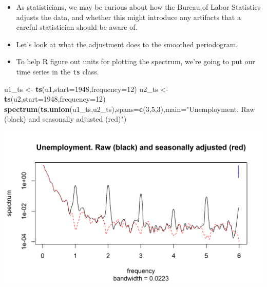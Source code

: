 \documentclass[]{article}
\newenvironment{Shaded}{\begin{snugshade}}{\end{snugshade}}
\newcommand{\KeywordTok}[1]{\textcolor[rgb]{0.13,0.29,0.53}{\textbf{#1}}}
\newcommand{\DataTypeTok}[1]{\textcolor[rgb]{0.13,0.29,0.53}{#1}}
\newcommand{\DecValTok}[1]{\textcolor[rgb]{0.00,0.00,0.81}{#1}}
\newcommand{\StringTok}[1]{\textcolor[rgb]{0.31,0.60,0.02}{#1}}
\newcommand{\NormalTok}[1]{#1}
\begin{document}
\begin{itemize}
\item
  As statisticians, we may be curious about how the Bureau of Labor
  Statistics adjusts the data, and whether this might introduce any
  artifacts that a careful statistician should be aware of.
\item
  Let's look at what the adjustment does to the smoothed periodogram.
\item
  To help R figure out units for plotting the spectrum, we're going to
  put our time series in the \texttt{ts} class.
\end{itemize}

\begin{Shaded}
\begin{Highlighting}[]
\NormalTok{u1_ts <-}\StringTok{ }\KeywordTok{ts}\NormalTok{(u1,}\DataTypeTok{start=}\DecValTok{1948}\NormalTok{,}\DataTypeTok{frequency=}\DecValTok{12}\NormalTok{)}
\NormalTok{u2_ts <-}\StringTok{ }\KeywordTok{ts}\NormalTok{(u2,}\DataTypeTok{start=}\DecValTok{1948}\NormalTok{,}\DataTypeTok{frequency=}\DecValTok{12}\NormalTok{)}
\KeywordTok{spectrum}\NormalTok{(}\KeywordTok{ts.union}\NormalTok{(u1_ts,u2_ts),}\DataTypeTok{spans=}\KeywordTok{c}\NormalTok{(}\DecValTok{3}\NormalTok{,}\DecValTok{5}\NormalTok{,}\DecValTok{3}\NormalTok{),}\DataTypeTok{main=}\StringTok{"Unemployment. Raw (black) and seasonally adjusted (red)"}\NormalTok{)}
\end{Highlighting}
\end{Shaded}

\begin{center}\includegraphics{figure/intro-adjustment_spectrum-1} \end{center}

\end{document}

